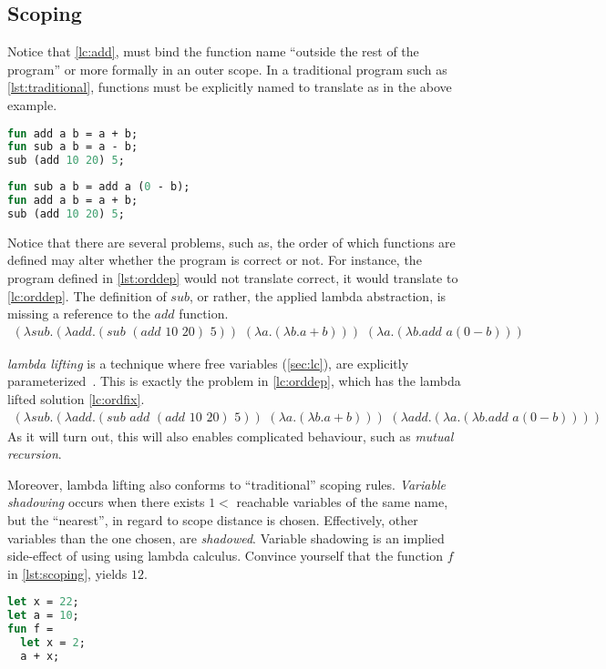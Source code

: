 \documentclass[11pt,oneside,a4paper]{report}
\begin{document}
\subsection{Scoping}\label{scoping}
Notice that \autoref{lc:add}, must bind the function name ``outside the rest of the program'' or more formally in an outer scope.
In a traditional program such as \autoref{lst:traditional}, functions must be explicitly named to translate as in the above example.
\begin{lstlisting}[language=ML,caption={A traditional program},label={lst:traditional}]
fun add a b = a + b;
fun sub a b = a - b;
sub (add 10 20) 5;
\end{lstlisting}
\begin{lstlisting}[language=ML,caption={An order dependant program},label={lst:orddep}]
fun sub a b = add a (0 - b);
fun add a b = a + b;
sub (add 10 20) 5;
\end{lstlisting}
Notice that there are several problems, such as, the order of which functions are defined may alter whether the program is correct or not.
For instance, the program defined in \autoref{lst:orddep} would not translate correct, it would translate to \autoref{lc:orddep}.
The definition of $sub$, or rather, the applied lambda abstraction, is missing a reference to the $add$ function.
\begin{align}
(\lambda sub . (\lambda add . (sub \,\, (add \,\, 10 \,\, 20) \,\, 5)) \,\, (\lambda a . (\lambda b . a + b))) \,\, (\lambda a . (\lambda b . add \,\, a (0 - b)))
\label{lc:orddep}
\end{align}

\textit{lambda lifting} is a technique where free variables (\autoref{sec:lc}), are explicitly parameterized~\cite{johnsson1985lambda}.
This is exactly the problem in \autoref{lc:orddep}, which has the lambda lifted solution \autoref{lc:ordfix}.
\begin{align}
(\lambda sub . (\lambda add . (sub \,\, add \,\, (add \,\, 10 \,\, 20) \,\, 5)) \,\, (\lambda a . (\lambda b . a + b))) \,\, (\lambda add .(\lambda a . (\lambda b . add \,\, a (0 - b))))
\label{lc:ordfix}
\end{align}
As it will turn out, this will also enables complicated behaviour, such as \textit{mutual recursion}.

Moreover, lambda lifting also conforms to ``traditional'' scoping rules.
\textit{Variable shadowing} occurs when there exists $1 < $ reachable variables of the same name, but the ``nearest'', in regard to scope distance is chosen.
Effectively, other variables than the one chosen, are \textit{shadowed}.
Variable shadowing is an implied side-effect of using using lambda calculus.
Convince yourself that the function $f$ in \autoref{lst:scoping}, yields $12$.
\begin{lstlisting}[language=ML,caption={Scoping rules in programming languages},label={lst:scoping}]
let x = 22;
let a = 10;
fun f = 
  let x = 2;
  a + x;
\end{lstlisting}
\end{document}
